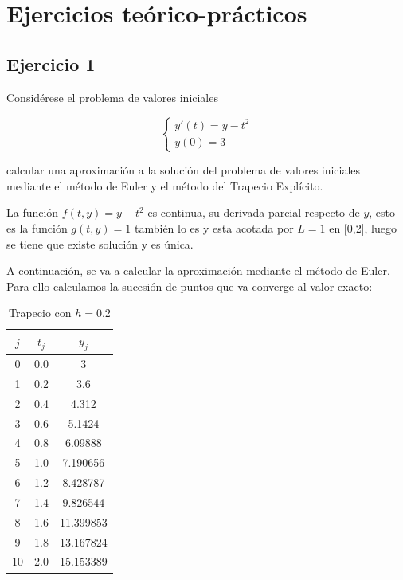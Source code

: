 \documentclass{article}
\theoremstyle{theorem-style}  %
\theoremstyle{definition-style}
\theoremstyle{example-style}
\begin{document}
\section{Ejercicios teórico-prácticos} \label{ejtp}

\subsection{Ejercicio 1} \label{ejtp1}

Considérese el problema de valores iniciales 

		\begin{equation*}
			\begin{cases}
				y'(t) = y - t^2 \\
				y(0) = 3 
			\end{cases}
		\end{equation*}

calcular una aproximación a la solución del problema de valores iniciales mediante el método de Euler y el método del Trapecio Explícito.

La función $f(t,y) = y - t^2$ es continua, su derivada parcial respecto de $y$, esto es la función $g(t,y) = 1$ también lo es y esta acotada por $L=1$ en [0,2], luego se tiene que existe solución y es única.

A continuación, se va a calcular la aproximación mediante el método de Euler. Para ello calculamos la sucesión de puntos que va converge al valor exacto:

	\begin{table}[H]
		\centering
		\begin{tabular}{|| c | c | c ||}
			\hline
			\hline $j$ &  $t_j $ & $y_j$\\
			\hline 0 & 0.0 & 3 \\
			\hline 1 & 0.2 & 3.6  \\
			\hline 2 & 0.4 & 4.312 \\
			\hline 3 & 0.6 & 5.1424 \\
			\hline 4 & 0.8 & 6.09888 \\
			\hline 5 & 1.0 & 7.190656 \\
			\hline 6 & 1.2 & 8.428787 \\
			\hline 7 & 1.4 & 9.826544 \\
			\hline 8 & 1.6 & 11.399853 \\
			\hline 9 & 1.8 & 13.167824 \\
			\hline 10 & 2.0 & 15.153389 \\
		\end{tabular}
		\caption{Trapecio con $h=0.2$}
		\label{table:trapecio-ejtp1.1}
	\end{table}
\end{document}

